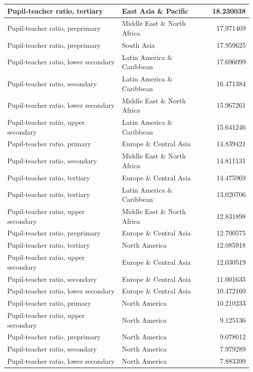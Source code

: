\documentclass[11pt,a4paper,]{article}
\begin{document}
\begin{table}
\begin{tabular}[t]{l|l|r}
\hline
Pupil-teacher ratio, tertiary & East Asia \& Pacific & 18.230038\\
\hline
Pupil-teacher ratio, preprimary & Middle East \& North Africa & 17.971469\\
\hline
Pupil-teacher ratio, preprimary & South Asia & 17.959625\\
\hline
Pupil-teacher ratio, lower secondary & Latin America \& Caribbean & 17.696099\\
\hline
Pupil-teacher ratio, secondary & Latin America \& Caribbean & 16.471384\\
\hline
Pupil-teacher ratio, lower secondary & Middle East \& North Africa & 15.967261\\
\hline
Pupil-teacher ratio, upper secondary & Latin America \& Caribbean & 15.641246\\
\hline
Pupil-teacher ratio, primary & Europe \& Central Asia & 14.839421\\
\hline
Pupil-teacher ratio, secondary & Middle East \& North Africa & 14.811131\\
\hline
Pupil-teacher ratio, tertiary & Europe \& Central Asia & 14.475969\\
\hline
Pupil-teacher ratio, tertiary & Latin America \& Caribbean & 13.020706\\
\hline
Pupil-teacher ratio, upper secondary & Middle East \& North Africa & 12.831898\\
\hline
Pupil-teacher ratio, preprimary & Europe \& Central Asia & 12.700575\\
\hline
Pupil-teacher ratio, tertiary & North America & 12.085918\\
\hline
Pupil-teacher ratio, upper secondary & Europe \& Central Asia & 12.030519\\
\hline
Pupil-teacher ratio, secondary & Europe \& Central Asia & 11.001635\\
\hline
Pupil-teacher ratio, lower secondary & Europe \& Central Asia & 10.472160\\
\hline
Pupil-teacher ratio, primary & North America & 10.210233\\
\hline
Pupil-teacher ratio, upper secondary & North America & 9.125136\\
\hline
Pupil-teacher ratio, preprimary & North America & 9.078012\\
\hline
Pupil-teacher ratio, secondary & North America & 7.979289\\
\hline
Pupil-teacher ratio, lower secondary & North America & 7.883399\\
\hline
\end{tabular}
\end{table}
\end{document}
